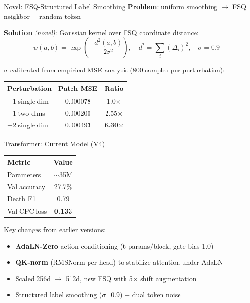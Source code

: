 \documentclass[aspectratio=169]{beamer}
\begin{document}
\begin{frame}[t]{Novel: FSQ-Structured Label Smoothing}
  \textbf{Problem}: uniform smoothing $\to$ FSQ neighbor = random token

  \vspace{0.5em}
  \textbf{Solution} {\color{insared}\textit{(novel)}}: Gaussian kernel over FSQ coordinate distance:
  \[
    w(a,b) = \exp\!\left(-\frac{d^2(a,b)}{2\sigma^2}\right), \quad d^2 = \sum_i (\Delta_i)^2, \quad \sigma = 0.9
  \]

  $\sigma$ calibrated from empirical MSE analysis (800 samples per perturbation):

  \vspace{0.2em}
  \begin{center}
    \small
    \begin{tabular}{lcc}
      \toprule
      Perturbation & Patch MSE & Ratio \\
      \midrule
      $\pm1$ single dim & 0.000078 & 1.0$\times$ \\
      $+1$ two dims & 0.000200 & 2.55$\times$ \\
      $+2$ single dim & 0.000493 & \textbf{6.30$\times$} \\
      \bottomrule
    \end{tabular}
  \end{center}

  \vspace{0.2em}\end{frame}

\begin{frame}{Transformer: Current Model (V4)}
  \vspace{0.5em}
  \begin{center}
    \small
    \begin{tabular}{lc}
      \toprule
      \textbf{Metric} & \textbf{Value} \\
      \midrule
      Parameters & $\sim$35M \\
      Val accuracy & 27.7\% \\
      Death F1 & 0.79 \\
      Val CPC loss & \textbf{0.133} \\
      \bottomrule
    \end{tabular}
  \end{center}

  \vspace{0.5em}
  Key changes from earlier versions:
  \begin{itemize}
    \item \textbf{AdaLN-Zero} action conditioning (6 params/block, gate bias 1.0)
    \item \textbf{QK-norm} (RMSNorm per head) to stabilize attention under AdaLN
    \item Scaled 256d $\to$ 512d, new FSQ with 5$\times$ shift augmentation
    \item Structured label smoothing ($\sigma$=0.9) + dual token noise
  \end{itemize}
\end{frame}
\end{document}
